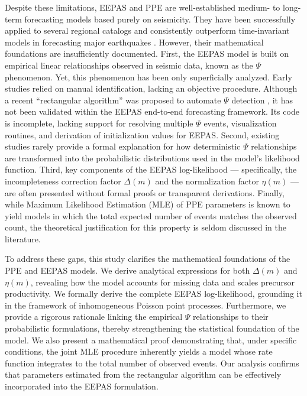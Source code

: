\documentclass[extra,mreferee]{gji}
\theoremstyle{lemma}
\begin{document}
Despite these limitations, EEPAS and PPE are well-established medium- to long-term forecasting models based purely on seismicity. They have been successfully applied to several regional catalogs and consistently outperform time-invariant models in forecasting major earthquakes \cite{2023ER,RE,rhoades2011,rhoades202220}. However, their mathematical foundations are insufficiently documented. First, the EEPAS model is built on empirical linear relationships observed in seismic data, known as the $\Psi$ phenomenon. Yet, this phenomenon has been only superficially analyzed. Early studies relied on manual identification, lacking an objective procedure. Although a recent “rectangular algorithm” was proposed to automate $\Psi$ detection \cite{psi}, it has not been validated within the EEPAS end-to-end forecasting framework. Its code is incomplete, lacking support for resolving multiple $\Psi$ events, visualization routines, and derivation of initialization values for EEPAS. Second, existing studies rarely provide a formal explanation for how deterministic $\Psi$ relationships are transformed into the probabilistic distributions used in the model’s likelihood function. Third, key components of the EEPAS log-likelihood — specifically, the incompleteness correction factor $\Delta(m)$ and the normalization factor $\eta(m)$ — are often presented without formal proofs or transparent derivations. Finally, while Maximum Likelihood Estimation (MLE) of PPE parameters is known to yield models in which the total expected number of events matches the observed count, the theoretical justification for this property is seldom discussed in the literature.

To address these gaps, this study clarifies the mathematical foundations of the PPE and EEPAS models. We derive analytical expressions for both $\Delta(m)$ and $\eta(m)$, revealing how the model accounts for missing data and scales precursor productivity. We formally derive the complete EEPAS log-likelihood, grounding it in the framework of inhomogeneous Poisson point processes. Furthermore, we provide a rigorous rationale linking the empirical $\Psi$ relationships to their probabilistic formulations, thereby strengthening the statistical foundation of the model. We also present a mathematical proof demonstrating that, under specific conditions, the joint MLE procedure inherently yields a model whose rate function integrates to the total number of observed events. Our analysis confirms that parameters estimated from the rectangular algorithm can be effectively incorporated into the EEPAS formulation.
\end{document}
